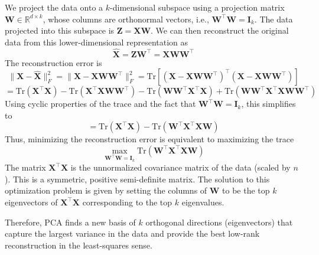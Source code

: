 We project the data onto a \(k\)-dimensional subspace using a projection matrix \(\mathbf{W} \in \mathbb{R}^{d \times k}\), whose columns are orthonormal vectors, i.e., \(\mathbf{W}^\top \mathbf{W} = \mathbf{I}_k\). The data projected into this subspace is \(\mathbf{Z} = \mathbf{X} \mathbf{W}\). We can then reconstruct the original data from this lower-dimensional representation as
\[
\hat{\mathbf{X}} = \mathbf{Z} \mathbf{W}^\top = \mathbf{X} \mathbf{W} \mathbf{W}^\top
\]
The reconstruction error is
\[
\|\mathbf{X} - \hat{\mathbf{X}}\|_F^2 = \|\mathbf{X} - \mathbf{X} \mathbf{W} \mathbf{W}^\top\|_F^2 = \text{Tr}[(\mathbf{X} - \mathbf{X} \mathbf{W} \mathbf{W}^\top)^\top (\mathbf{X} - \mathbf{X} \mathbf{W} \mathbf{W}^\top)]
\]
\[
= \text{Tr}(\mathbf{X}^\top \mathbf{X}) - \text{Tr}(\mathbf{X}^\top \mathbf{X} \mathbf{W} \mathbf{W}^\top) - \text{Tr}(\mathbf{W} \mathbf{W}^\top \mathbf{X}^\top \mathbf{X}) + \text{Tr}(\mathbf{W} \mathbf{W}^\top \mathbf{X}^\top \mathbf{X} \mathbf{W} \mathbf{W}^\top)
\]
Using cyclic properties of the trace and the fact that \(\mathbf{W}^\top \mathbf{W} = \mathbf{I}_k\), this simplifies to
\[
= \text{Tr}(\mathbf{X}^\top \mathbf{X}) - \text{Tr}(\mathbf{W}^\top \mathbf{X}^\top \mathbf{X} \mathbf{W})
\]
Thus, minimizing the reconstruction error is equivalent to maximizing the trace
\[
\max_{\mathbf{W}^\top \mathbf{W} = \mathbf{I}_k} \text{Tr}(\mathbf{W}^\top \mathbf{X}^\top \mathbf{X} \mathbf{W})
\]
The matrix \(\mathbf{X}^\top \mathbf{X}\) is the unnormalized covariance matrix of the data (scaled by \(n\)). This is a symmetric, positive semi-definite matrix. The solution to this optimization problem is given by setting the columns of \(\mathbf{W}\) to be the top \(k\) eigenvectors of \(\mathbf{X}^\top \mathbf{X}\) corresponding to the top \(k\) eigenvalues.

Therefore, PCA finds a new basis of \(k\) orthogonal directions (eigenvectors) that capture the largest variance in the data and provide the best low-rank reconstruction in the least-squares sense.

